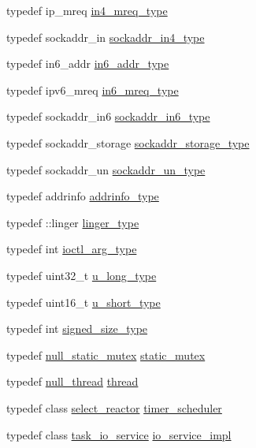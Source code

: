 \begin{DoxyCompactItemize}
\item 
typedef ip\+\_\+mreq \hyperlink{namespaceasio_1_1detail_abe51233cc09e73aeac58af43675ad976}{in4\+\_\+mreq\+\_\+type}
\item 
typedef sockaddr\+\_\+in \hyperlink{namespaceasio_1_1detail_a80851db41f97eb12822e2f409d444aa6}{sockaddr\+\_\+in4\+\_\+type}
\item 
typedef in6\+\_\+addr \hyperlink{namespaceasio_1_1detail_a6fbf4772e59936aa45276af1dc653ab4}{in6\+\_\+addr\+\_\+type}
\item 
typedef ipv6\+\_\+mreq \hyperlink{namespaceasio_1_1detail_acbb283b0a4fe49399a5c10a0ffa73972}{in6\+\_\+mreq\+\_\+type}
\item 
typedef sockaddr\+\_\+in6 \hyperlink{namespaceasio_1_1detail_a57768e6ae10076201e58c76fe4e8495d}{sockaddr\+\_\+in6\+\_\+type}
\item 
typedef sockaddr\+\_\+storage \hyperlink{namespaceasio_1_1detail_a5b5da7704fe08eec4df1fb52b6d1bf98}{sockaddr\+\_\+storage\+\_\+type}
\item 
typedef sockaddr\+\_\+un \hyperlink{namespaceasio_1_1detail_ab1311931a71e98cfaf6b81fe317e534d}{sockaddr\+\_\+un\+\_\+type}
\item 
typedef addrinfo \hyperlink{namespaceasio_1_1detail_ad8df56a17e3aa9ce2ad251fb76426e67}{addrinfo\+\_\+type}
\item 
typedef \+::linger \hyperlink{namespaceasio_1_1detail_a417cb909eef0654a2e53adc1f4dd2dc1}{linger\+\_\+type}
\item 
typedef int \hyperlink{namespaceasio_1_1detail_a27f72e1b8b785eaaa59ddc6b41751106}{ioctl\+\_\+arg\+\_\+type}
\item 
typedef uint32\+\_\+t \hyperlink{namespaceasio_1_1detail_a875fc877056700355cc63b79b29687bc}{u\+\_\+long\+\_\+type}
\item 
typedef uint16\+\_\+t \hyperlink{namespaceasio_1_1detail_a06a0b3d4e1daccdccf9ebc949c7d29c0}{u\+\_\+short\+\_\+type}
\item 
typedef int \hyperlink{namespaceasio_1_1detail_a0912273eb9e5fcdaef1b12e9b77e9f07}{signed\+\_\+size\+\_\+type}
\item 
typedef \hyperlink{structasio_1_1detail_1_1null__static__mutex}{null\+\_\+static\+\_\+mutex} \hyperlink{namespaceasio_1_1detail_a7c96c5c11c31acb79c355cdbcf4d069a}{static\+\_\+mutex}
\item 
typedef \hyperlink{classasio_1_1detail_1_1null__thread}{null\+\_\+thread} \hyperlink{namespaceasio_1_1detail_adaf42fbdc0c550e0a926a0395898572a}{thread}
\item 
typedef class \hyperlink{classasio_1_1detail_1_1select__reactor}{select\+\_\+reactor} \hyperlink{namespaceasio_1_1detail_abb0125752bc593c76015c71b57395b15}{timer\+\_\+scheduler}
\item 
typedef class \hyperlink{classasio_1_1detail_1_1task__io__service}{task\+\_\+io\+\_\+service} \hyperlink{namespaceasio_1_1detail_a6d61d9b8e53c11288be549d82aec5a42}{io\+\_\+service\+\_\+impl}
\end{DoxyCompactItemize}
